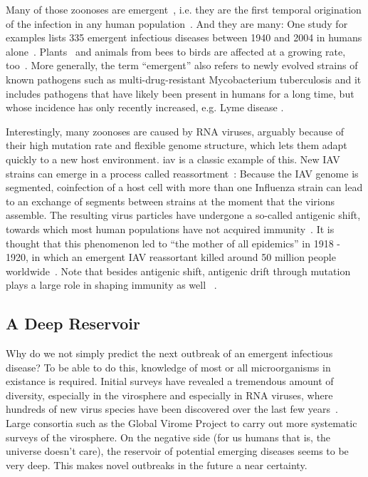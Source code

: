Many of those zoonoses are emergent~\cite{Wolfe2007-iy}, i.e. they are the first temporal origination of the infection in any human population~\cite{Smith2014-km}. And they are many: One study for examples lists 335 emergent infectious diseases between 1940 and 2004 in humans alone~\cite{Smith2014-km}. Plants~\cite{Elena2011-lx, Hanssen2010-ep, Navas-Castillo2011-lj} and animals from bees to birds are affected at a growing rate, too~\cite{Weaver2010-zg}. More generally, the term ``emergent'' also refers to newly evolved strains of known pathogens such as multi-drug-resistant Mycobacterium tuberculosis and it includes pathogens that have likely been present in humans for a long time, but whose incidence has only recently increased, e.g. Lyme disease \cite{Jones2008-mw}.

Interestingly, many zoonoses are caused by RNA viruses, arguably because of their high mutation rate and flexible genome structure, which lets them adapt quickly to a new host environment. \gls{iav} is a classic example of this. New IAV strains can emerge in a process called reassortment~\cite{Holmes2005-wg}: Because the IAV genome is segmented, coinfection of a host cell with more than one Influenza strain can lead to an exchange of segments between strains at the moment that the virions assemble. The resulting virus particles have undergone a so-called antigenic shift, towards which most human populations have not acquired immunity~\cite{Worobey2014-zp, Rambaut2008-pm}. It is thought that this phenomenon led to ``the mother of all epidemics'' in 1918 - 1920, in which an emergent IAV reassortant killed around 50 million people worldwide~\cite{Taubenberger2012-qi, Taubenberger2006-do}. Note that besides antigenic shift, antigenic drift through mutation plays a large role in shaping immunity as well ~\cite{Bedford2014-he, Bedford2015-vu}.


\subsection{A Deep Reservoir}

Why do we not simply predict the next outbreak of an emergent infectious disease? To be able to do this, knowledge of most or all microorganisms in existance is required. Initial surveys have revealed a tremendous amount of diversity, especially in the virosphere and especially in RNA viruses, where hundreds of new virus species have been discovered over the last few years~\cite{Pesant2015-yq, Brum2015-tv, Shi2016-rt, Paez-Espino2016-ej}. Large consortia such as the Global Virome Project to carry out more systematic surveys of the virosphere. On the negative side (for us humans that is, the universe doesn't care), the reservoir of potential emerging diseases seems to be very deep. This makes novel outbreaks in the future a near certainty.


